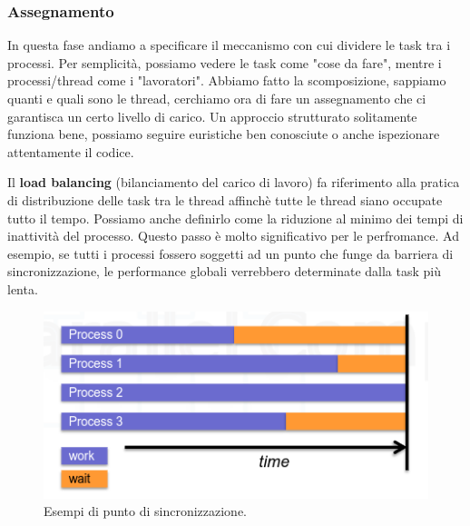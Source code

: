 \subsubsection{Assegnamento}
In questa fase andiamo a specificare il meccanismo con cui dividere le task tra i processi. Per semplicità, possiamo vedere le task come "cose da fare", mentre i processi/thread come i "lavoratori". Abbiamo fatto la scomposizione, sappiamo quanti e quali sono le thread, cerchiamo ora di fare un assegnamento che ci garantisca un certo livello di carico. 
Un approccio strutturato solitamente funziona bene, possiamo seguire euristiche ben conosciute o anche ispezionare attentamente il codice.


Il \textbf{load balancing} (bilanciamento del carico di lavoro) fa riferimento alla pratica di distribuzione delle task tra le thread affinchè tutte le thread siano occupate tutto il tempo. Possiamo anche definirlo come la riduzione al minimo dei tempi di inattività del processo. Questo passo è molto significativo per le perfromance. Ad esempio, se tutti i processi fossero soggetti ad un punto che funge da barriera di sincronizzazione, le performance globali verrebbero determinate dalla task più lenta.
\begin{figure}[th]
	\centering
	\includegraphics[width=0.7\linewidth]{img/barrier-sync.png}
	\caption{Esempi di punto di sincronizzazione.}
	\label{fig:barrier-sync}
\end{figure}

